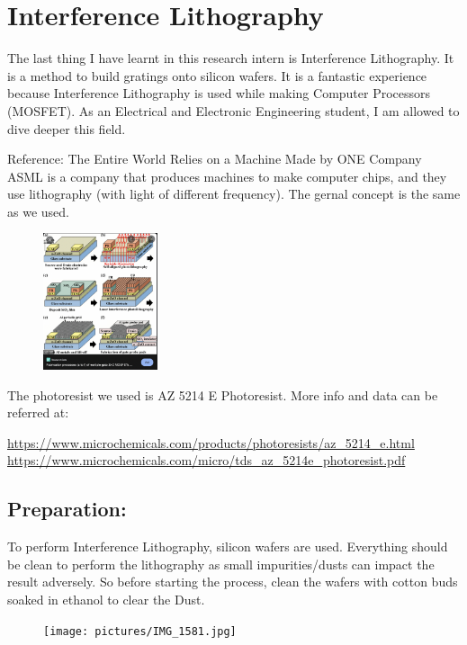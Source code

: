 \documentclass{article}
\begin{document}
\section{Interference Lithography}

The last thing I have learnt in this research intern is Interference Lithography. It is a method to build gratings onto silicon wafers. It is a fantastic experience because Interference Lithography is used while making Computer Processors (MOSFET). As an Electrical and Electronic Engineering student, I am allowed to dive deeper this field.

Reference:
The Entire World Relies on a Machine Made by ONE Company
ASML is a company that produces machines to make computer chips, and they use lithography (with light of different frequency). The gernal concept is the same as we used.

\begin{figure}[H]
\centering
\includegraphics[width=0.3\textwidth,angle=0,origin=c]{pictures/lithographymosfet.png}
\end{figure}


The photoresist we used is AZ 5214 E Photoresist. More info and data can be referred at:


\url{https://www.microchemicals.com/products/photoresists/az\_5214\_e.html}
\\
\url{https://www.microchemicals.com/micro/tds\_az\_5214e\_photoresist.pdf}

\subsection{Preparation:}

To perform Interference Lithography, silicon wafers are used. Everything should be clean to perform the lithography as small impurities/dusts can impact the result adversely. So before starting the process, clean the wafers with cotton buds soaked in ethanol to clear the Dust.


\begin{figure}[H]
\centering
\texttt{[image: pictures/IMG\_1581.jpg]}
\end{figure}
\end{document}
